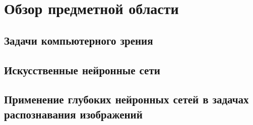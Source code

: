 \section{Обзор предметной области}

\subsection{Задачи компьютерного зрения}

\subsection{Искусственные нейронные сети}

\subsection{Применение глубоких нейронных сетей в задачах распознавания изображений}